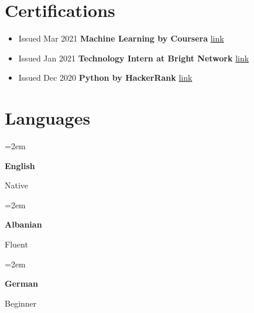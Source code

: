 \documentclass[11pt]{article} %
\newlength{\spacebox}
\newcommand{\lan}[2]{      
	
	
	\noindent\hangindent=2em\hangafter=0     
	
	
	\parbox{\spacebox}{%
		
		\textbf{#1}} %
	
	#2 \par}    %
\begin{document}
	
	\section*{Certifications}
	
		\begin{itemize}
			\item{Issued Mar 2021}
			\textbf{Machine Learning by Coursera}
			{\href{https://coursera.org/verify/4YYK2Y233Y6Z}{link}}
		
			\item{Issued Jan 2021}
			\textbf{Technology Intern at Bright Network}
			{\href{https://www.brightnetwork.co.uk/certificates/technology-internship-experien_2d14qoedf44spg/}{link}}
			
			\item{Issued Dec 2020}
			\textbf{Python by HackerRank}
			{\href{https://www.hackerrank.com/certificates/629ffbd69653}{link}}
		\end{itemize}
	
	
	\section*{Languages}
	
	\lan{English}{Native} 
	
	\lan{Albanian}{Fluent} 
	
	\lan{German}{Beginner}
	
\end{document}
